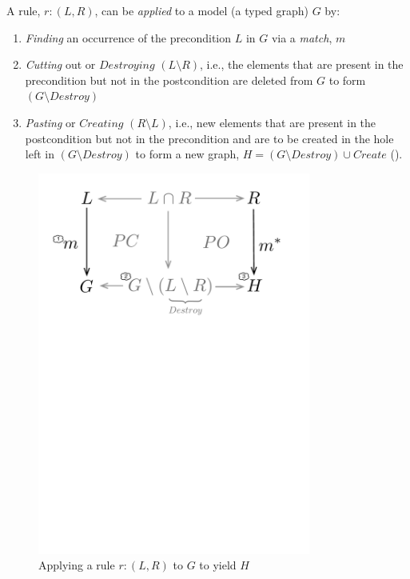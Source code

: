 A rule, $r: (L,R)$, can be \emph{applied} to a model (a typed graph) $G$ by:
\begin{enumerate}
  \item \emph{Finding} an occurrence of the precondition $L$ in $G$ via a \emph{match}, $m$
  
  \item \emph{Cutting} out or $Destroying$ $(L\setminus R)$, i.e., the elements that are present in the precondition but not in the postcondition are deleted
  from $G$ to form  $(G\setminus Destroy)$
  
  \item \emph{Pasting} or $Creating$ $(R\setminus L)$, i.e., new elements that are present in the postcondition but not in the precondition and are to be created
  in the hole left in $(G\setminus Destroy)$ to form a new graph, $H = (G\setminus Destroy) \cup Create$ (). 
  
  \end{enumerate}

\vspace{0.5cm}

\begin{figure}[htp]
\begin{center}
  \includegraphics[width=0.8\textwidth]{../../org.moflon.doc.handbook.03_storyDiagrams/02_transformationsExplained/teImages/rule_application}
  \caption[]{Applying a rule $r: (L,R)$ to $G$ to yield $H$} 
  \label{fig:rule_application}
\end{center}
\end{figure}

